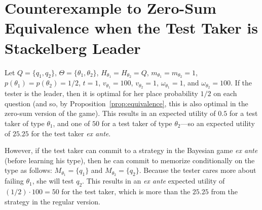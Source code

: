 \documentclass{article}
\begin{document}
\appendix

\section{Counterexample to Zero-Sum Equivalence when the Test Taker is
  Stackelberg Leader}
\label{se:counterexample}

Let $Q=\{q_1,q_2\}$, $\Theta=\{\theta_1,\theta_2\}$,
$H_{\theta_1}=H_{\theta_2}=Q$, $m_{\theta_1}=m_{\theta_2}=1$,
$p(\theta_1)=p(\theta_2)=1/2$, $t=1$, $v_{\theta_1} = 100$, $v_{\theta_2} =
1$, $\omega_{\theta_1} = 1$, and $\omega_{\theta_2} = 100$.  If the tester
is the leader, then it is optimal for her place probability $1/2$ on each
question (and so, by Proposition~\ref{prop:equivalence}, this is also
optimal in the zero-sum version of the game).  This results in an expected
utility of $0.5$ for a test taker of type $\theta_1$, and one of $50$ for a
test taker of type $\theta_2$---so an expected utility of $25.25$ for the
test taker {\em ex ante}.

However, if the test taker can commit to a strategy in the Bayesian game
{\em ex ante} (before learning his type), then he can commit to
memorize conditionally on the type as follows: $M_{\theta_1} =\{q_1\}$ and 
$M_{\theta_2} =\{q_2\}$.  Because the tester cares more about failing
$\theta_1$, she will test $q_2$.  This results in an {\em ex ante} expected
utility of $(1/2) \cdot 100 = 50$ for the test taker, which is more than
the $25.25$ from the strategy in the regular version.

















\end{document}
